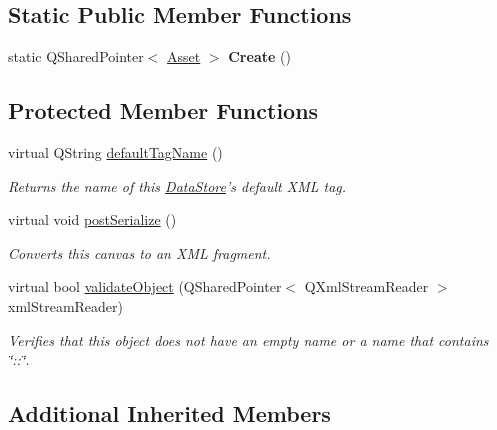 \begin{DoxyCompactItemize}
\end{DoxyCompactItemize}
\subsection*{Static Public Member Functions}
\begin{DoxyCompactItemize}
\item 
\hypertarget{class_picto_1_1_layer_abf86b02dd18c488ca48cbd90f559b832}{static Q\-Shared\-Pointer$<$ \hyperlink{class_picto_1_1_asset}{Asset} $>$ {\bfseries Create} ()}\label{class_picto_1_1_layer_abf86b02dd18c488ca48cbd90f559b832}

\end{DoxyCompactItemize}
\subsection*{Protected Member Functions}
\begin{DoxyCompactItemize}
\item 
virtual Q\-String \hyperlink{class_picto_1_1_layer_a13a62757ea53b102bac0a71fcabec887}{default\-Tag\-Name} ()
\begin{DoxyCompactList}\small\item\em Returns the name of this \hyperlink{class_picto_1_1_data_store}{Data\-Store}'s default X\-M\-L tag. \end{DoxyCompactList}\item 
virtual void \hyperlink{class_picto_1_1_layer_a876e2b14eff3b16b5f68622e6558d81e}{post\-Serialize} ()
\begin{DoxyCompactList}\small\item\em Converts this canvas to an X\-M\-L fragment. \end{DoxyCompactList}\item 
\hypertarget{class_picto_1_1_layer_a676ead3b97985d8ca64770c1ed34512f}{virtual bool \hyperlink{class_picto_1_1_layer_a676ead3b97985d8ca64770c1ed34512f}{validate\-Object} (Q\-Shared\-Pointer$<$ Q\-Xml\-Stream\-Reader $>$ xml\-Stream\-Reader)}\label{class_picto_1_1_layer_a676ead3b97985d8ca64770c1ed34512f}

\begin{DoxyCompactList}\small\item\em Verifies that this object does not have an empty name or a name that contains \char`\"{}\-::\char`\"{}. \end{DoxyCompactList}\end{DoxyCompactItemize}
\subsection*{Additional Inherited Members}


